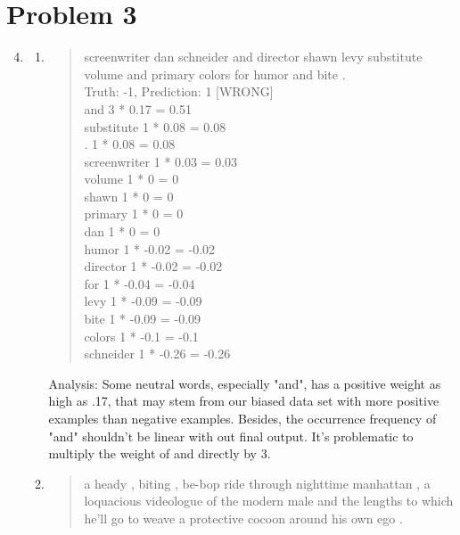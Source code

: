\documentclass[12pt]{article}
\begin{document}
\section*{Problem 3}    
\begin{enumerate}[label=(\alph*)]
  \setcounter{enumi}{3}
  \item
    \begin{enumerate}[label=\arabic*.]
    \item
      \begin{quote}
      screenwriter dan schneider and director shawn levy substitute volume and primary colors for humor and bite . \\
Truth: -1, Prediction: 1 [WRONG] \\
and                         3 * 0.17 = 0.51 \\
substitute                    1 * 0.08 = 0.08 \\
.                             1 * 0.08 = 0.08 \\
screenwriter                  1 * 0.03 = 0.03 \\
volume                        1 * 0 = 0 \\
shawn                         1 * 0 = 0 \\
primary                       1 * 0 = 0 \\
dan                           1 * 0 = 0 \\
humor                         1 * -0.02 = -0.02 \\
director                      1 * -0.02 = -0.02 \\
for                           1 * -0.04 = -0.04 \\
levy                          1 * -0.09 = -0.09 \\
bite                          1 * -0.09 = -0.09 \\
colors                        1 * -0.1 = -0.1 \\
schneider                     1 * -0.26 = -0.26
      \end{quote}
    Analysis: Some neutral words, especially "and", has a positive weight as high as .17, that may stem from our biased data set with more positive examples than negative examples. Besides, the occurrence frequency of "and" shouldn't be linear with out final output. It's problematic to multiply the weight of and directly by 3.
    \item  
      \begin{quote}
        a heady , biting , be-bop ride through nighttime manhattan , a loquacious videologue of the modern male and the lengths to which he'll go to weave a protective cocoon around his own ego . \\

\end{quote}
\end{enumerate}
\end{enumerate}
\end{document}
